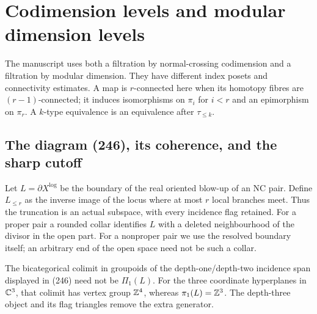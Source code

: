 \section{Codimension levels and modular dimension levels}
\label{sec:levels}

The manuscript uses both a filtration by normal-crossing codimension and
a filtration by modular dimension. They have different index posets and
connectivity estimates. A map is \(r\)-connected here when its homotopy
fibres are \((r-1)\)-connected; it induces isomorphisms on \(\pi_i\) for
\(i<r\) and an epimorphism on \(\pi_r\). A \(k\)-type equivalence is an
equivalence after \(\tau_{\leq k}\).

\subsection{The diagram (246), its coherence, and the sharp cutoff}

Let \(L=\partial X^{\log}\) be the boundary of the real oriented blow-up
of an NC pair. Define \(L_{\leq r}\) as the inverse image of the locus
where at most \(r\) local branches meet. Thus the truncation is an actual
subspace, with every incidence flag retained. For a proper pair a rounded
collar identifies \(L\) with a deleted neighbourhood of the divisor in
the open part. For a nonproper pair we use the resolved boundary itself;
an arbitrary end of the open space need not be such a collar.

\begin{proposition}\label{P5a1}
The bicategorical colimit in groupoids of the depth-one/depth-two
incidence span displayed in (246) need not be \(\Pi_1(L)\).
For the three coordinate hyperplanes in \(\mathbb C^3\), that colimit has vertex
group \(\mathbb Z^4\), whereas \(\pi_1(L)=\mathbb Z^3\). The depth-three object and its
flag triangles remove the extra generator.
\end{proposition}


